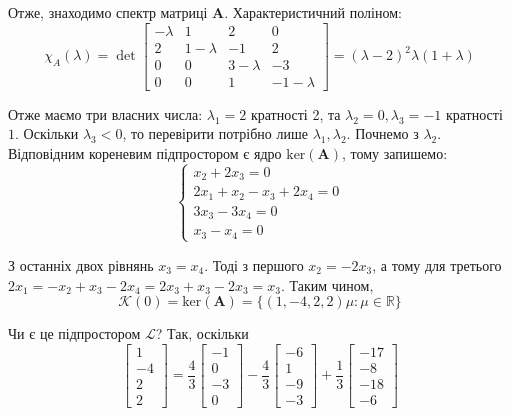 \documentclass[oneside,solution]{karazin-control-assign}
\begin{document}
Отже, знаходимо спектр матриці $\boldsymbol{A}$. Характеристичний поліном:
\begin{equation}
    \chi_A(\lambda) = \det\begin{bmatrix}
        -\lambda & 1 & 2 & 0 \\
        2 & 1-\lambda & -1 & 2 \\
        0 & 0 & 3-\lambda & -3 \\
        0 & 0 & 1 & -1-\lambda
    \end{bmatrix} = (\lambda-2)^2\lambda(1+\lambda)
\end{equation}

Отже маємо три власних числа: $\lambda_1=2$ кратності 2, та $\lambda_2=0,\lambda_3=-1$ кратності $1$. Оскільки $\lambda_3<0$, то перевірити потрібно лише $\lambda_1,\lambda_2$. Почнемо з $\lambda_2$. Відповідним кореневим підпростором є ядро $\text{ker}(\boldsymbol{A})$, тому запишемо:
\begin{equation}
    \begin{cases}
        x_2 + 2x_3 = 0 \\
        2x_1 + x_2 - x_3 + 2x_4 = 0 \\
        3x_3 - 3x_4 = 0\\
        x_3 - x_4 = 0
    \end{cases}
\end{equation}

З останніх двох рівнянь $x_3=x_4$. Тоді з першого $x_2=-2x_3$, а тому для третього $2x_1 = -x_2+x_3-2x_4=2x_3+x_3-2x_3=x_3$. Таким чином,
\begin{equation}
    \mathcal{K}(0) = \text{ker}(\boldsymbol{A}) = \{(1,-4,2,2)\mu: \mu \in \mathbb{R}\}
\end{equation}

Чи є це підпростором $\mathcal{L}$? Так, оскільки
\begin{equation}
    \begin{bmatrix}
        1 \\ -4 \\ 2 \\ 2
    \end{bmatrix} = \frac{4}{3}\begin{bmatrix}
        -1 \\ 0 \\ -3 \\ 0
    \end{bmatrix} - \frac{4}{3}\begin{bmatrix}
        -6 \\ 1 \\ -9 \\ -3
    \end{bmatrix} + \frac{1}{3}\begin{bmatrix}
        -17 \\ -8 \\ -18 \\ -6
    \end{bmatrix}
\end{equation}
\end{document}
